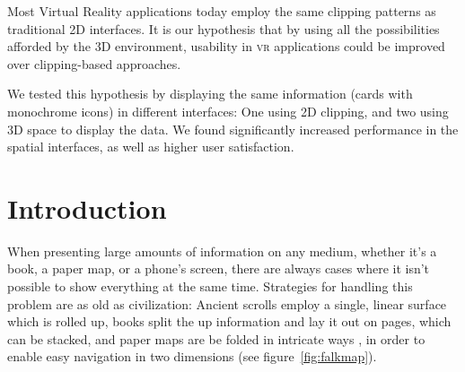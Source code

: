 \documentclass{tufte-book} %
\begin{document}
Most Virtual Reality applications today employ the same clipping patterns as traditional 2D interfaces. It is our hypothesis that by using all the possibilities afforded by the 3D environment, usability in \textsc{vr} applications could be improved over clipping-based approaches.

We tested this hypothesis by displaying the same information (cards with monochrome icons) in different interfaces: One using 2D clipping, and two using 3D space to display the data. We found significantly increased performance in the spatial interfaces, as well as higher user satisfaction.




\chapter{Introduction} %

When presenting large amounts of information on any medium, whether it's a book, a paper map, or a phone's screen, there are always cases where it isn't possible to show everything at the same time. Strategies for handling this problem are as old as civilization: Ancient scrolls employ a single, linear surface which is rolled up, books split the up information and lay it out on pages, which can be stacked, and paper maps are be folded in intricate ways \cite{angsusser2012map}, in order to enable easy navigation in two dimensions (see figure~\ref{fig:falkmap}).
\end{document}
